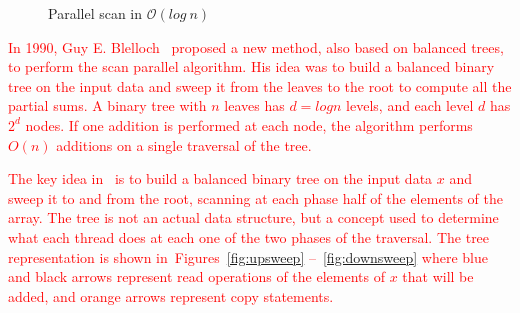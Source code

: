 \documentclass[Ingles]{ic-tese-v1}
\newcommand{\ed}[1]{\noindent\textcolor{red}{ {#1}}}
\newcommand{\ed}[1]{}
\newcommand{\rfigs}[2]{Figures~\ref{fig:#1} --~\ref{fig:#2}}
\begin{document}
\begin{figure}[t]
	\centering
	\caption{Parallel scan in $\mathcal{O}(log\  n)$}
	\vfill
\end{figure}

\ed{In 1990, Guy  E. Blelloch~\cite{ScanAsPrimitive} proposed a new method,
also based on balanced trees,  to perform the scan parallel algorithm.  
His idea  was to build a balanced binary tree on the input data and sweep
it from the leaves to the root to compute all the partial sums. A binary
tree with $n$ leaves has $d = log n$ levels, and each level $d$ has $2^{d}$
nodes. If one addition is performed at each node, the algorithm  performs 
$O(n)$ additions on a single traversal of the tree.}

\ed{The key  idea in~\cite{ScanAsPrimitive} is  to build a  balanced binary
tree on the input data $x$ and  sweep it to and from the root, scanning
at each phase half  of the elements of the array.  The  tree is not an
actual  data structure,  but a  concept  used to  determine what  each
thread does at each one of the  two phases of the traversal.  The tree
representation is  shown in~\rfigs{upsweep}{downsweep} where  blue and
black arrows  represent read  operations of the  elements of  $x$ that
will be added, and orange arrows represent copy statements.}
\end{document}
